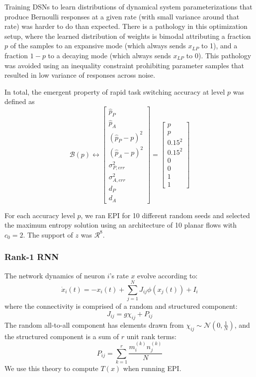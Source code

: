 \documentclass[11pt]{article}
\begin{document}
Training DSNs to learn distributions of dynamical system parameterizations that produce Bernoulli responses at a given rate (with small variance around that rate) was harder to do than expected.  There is a pathology in this optimization setup, where the learned distribution of weights is bimodal attributing a fraction $p$ of the samples to an expansive mode (which always sends $x_{LP}$ to 1), and a fraction $1-p$ to a decaying mode (which always sends $x_{LP}$ to 0).  This pathology was avoided using an inequality constraint prohibiting parameter samples that resulted in low variance of responses across noise.

In total, the emergent property of rapid task switching accuracy at level $p$ was defined as
\begin{equation}
\mathcal{B}(p) \leftrightarrow \begin{bmatrix} \hat{p}_P \\ \hat{p}_A \\ (\hat{p}_P-p)^2 \\ (\hat{p}_A - p)^2 \\ \sigma^2_{P,err} \\ \sigma^2_{A,err} \\ d_P \\ d_A \end{bmatrix} = \begin{bmatrix} p \\ p \\ 0.15^2 \\ 0.15^2 \\ 0 \\ 0 \\ 1 \\ 1 \end{bmatrix}
\end{equation}

For each accuracy level $p$, we ran EPI for 10 different random seeds and selected the maximum entropy solution using an architecture of 10 planar flows with $c_0 = 2$. The support of $z$ was $\mathcal{R}^8$.

\subsubsection{Rank-1 RNN}\label{methods_LRRNN}
The network dynamics of neuron $i$'s rate $x$ evolve according to:
\begin{equation}
\dot{x}_i(t) = -x_i(t) + \sum_{j=1}^N J_{ij} \phi(x_j(t)) + I_i 
\end{equation}
where the connectivity is comprised of a random and structured component:
\begin{equation}
J_{ij} = g \chi_{ij} + P_{ij}
\end{equation}
The random all-to-all component has elements drawn from
$\chi_{ij} \sim \mathcal{N}(0, \frac{1}{N})$, and the structured
component is a sum of $r$ unit rank terms:
\begin{equation}
P_{ij} = \sum_{k=1}^r \frac{m_i^{(k)}n_j^{(k)}}{N}
\end{equation}
We use this theory to compute $T(x)$ when running EPI.
\end{document}
